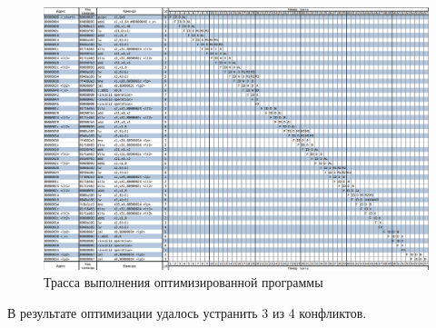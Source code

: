 \begin{figure}[H]
	\begin{center}
		\includegraphics[scale=0.2]{img/pipe.png}
	\end{center}
	\captionsetup{justification=centering}
	\caption{Трасса выполнения оптимизированной программы}
	\label{img:pipe}
\end{figure}

В результате оптимизации удалось устранить 3 из 4 конфликтов.